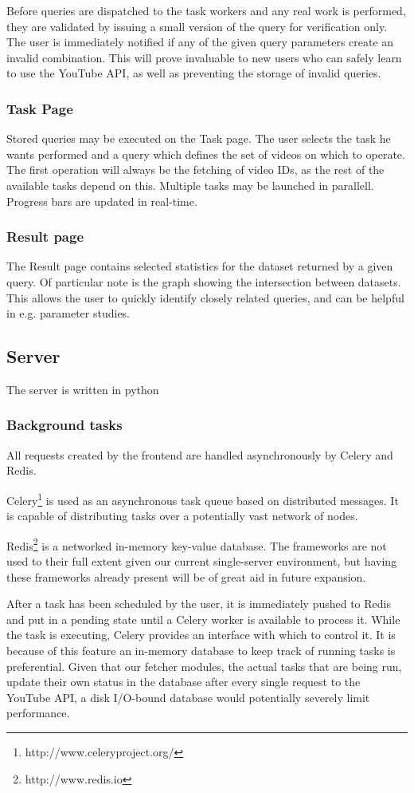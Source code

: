 Before queries are dispatched to the task workers and any real work is
performed, they are validated by issuing a small version of the query for
verification only. The user is immediately notified if any of the given query
parameters create an invalid combination. This will prove invaluable to new
users who can safely learn to use the YouTube API, as well as preventing
the storage of invalid queries.


\subsubsection{Task Page}
Stored queries may be executed on the Task page. The user selects the task he
wants performed and a query which defines the set of videos on which to operate.
The first operation will always be the fetching of video IDs, as the rest of the
available tasks depend on this. Multiple tasks may be launched in parallell.
Progress bars are updated in real-time. %


\subsubsection{Result page}
The Result page contains selected statistics for the dataset returned by a given
query. Of particular note is the graph showing the intersection between datasets. This
allows the user to quickly identify closely related queries, and can be helpful
in e.g. parameter studies.


\subsection{Server}
The server is written in python %


\subsubsection{Background tasks}
All requests created by the frontend are handled asynchronously by Celery and
Redis.

Celery\footnote{http://www.celeryproject.org/} is used as an asynchronous task
queue based on distributed messages. It is capable of distributing tasks over a
potentially vast network of nodes.

Redis\footnote{http://www.redis.io} is a networked in-memory key-value database.
The frameworks are not used to their full extent given
our current single-server environment, but having these frameworks already
present will be of great aid in future expansion.

After a task has been scheduled by the user, it is immediately pushed to Redis
and put in a pending state until a Celery worker is available to process it.
While the task is executing, Celery provides an interface with which to control
it. It is because of this feature an in-memory database to keep track of running
tasks is preferential. Given that our fetcher modules, the actual tasks that are
being run, update their own status in the database after every single request to
the YouTube API, a disk I/O-bound database would potentially severely limit
performance.

